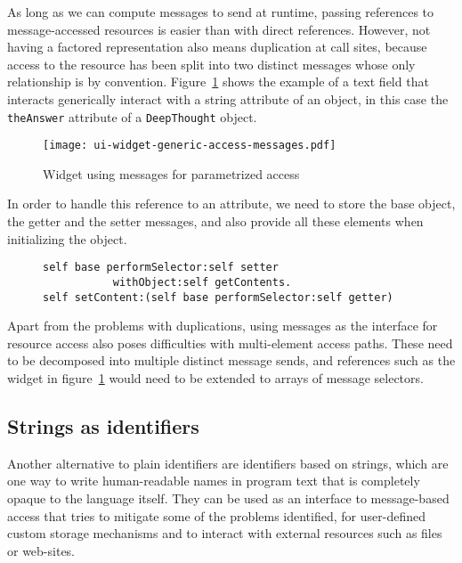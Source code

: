 \documentclass[preprint,authoryear]{acm_proc_article-sp}
\begin{document}
As long as we can compute messages to send at runtime,
passing references to message-accessed resources is easier than with
direct references.  However, not having a factored representation also means
duplication at call sites, because 
access to the resource has been split into two distinct messages whose only relationship is by 
convention.   Figure~\ref{ui-widget-msg-access} shows the example of a text field
that interacts generically interact with a string attribute of an object, in 
this case the {\tt theAnswer} attribute of a {\tt DeepThought} object.

\begin{figure}[htbp]
\begin{center}
\texttt{[image: ui-widget-generic-access-messages.pdf]}
\caption{Widget using messages for parametrized access}
\label{ui-widget-msg-access}
\end{center}
\end{figure}

In order to handle this reference to an attribute, we need to store the base object,
the getter and the setter messages, and also provide all these elements when
initializing the object.

\begin{figure}[htbp]
\begin{lstlisting}[style=numbers,label=parametrized-message-access,caption=Parametrized access via messages.]
self base performSelector:self setter 
	       withObject:self getContents.
self setContent:(self base performSelector:self getter)
\end{lstlisting}
\end{figure}

Apart from the problems with duplications, using messages as the interface for resource
access also poses difficulties with multi-element access paths.  These need to be decomposed
into multiple distinct message sends, and references such as the widget in figure~\ref{ui-widget-msg-access}
would need to be extended to arrays of message selectors.

\subsection{Strings as identifiers}

Another alternative to plain identifiers are identifiers based on strings, which are one 
way to write human-readable names in program text that is completely opaque to the language itself.
They can be used as an interface to message-based access that tries to mitigate some of the problems
identified, for user-defined custom storage
mechanisms and to interact with external resources such as files or web-sites.
\end{document}
